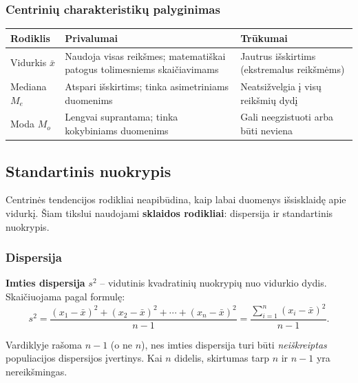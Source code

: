 \subsubsection*{Centrinių charakteristikų palyginimas}

\begin{center}
\begin{tabular}{|l|p{4.5cm}|p{4.5cm}|}
\hline
\textbf{Rodiklis} & \textbf{Privalumai} & \textbf{Trūkumai} \\
\hline
Vidurkis $\bar{x}$ &
  Naudoja visas reikšmes; matematiškai patogus tolimesniems skaičiavimams &
  Jautrus išskirtims (ekstremalus reikšmėms) \\
\hline
Mediana $M_e$ &
  Atspari išskirtims; tinka asimetriniams duomenims &
  Neatsižvelgia į visų reikšmių dydį \\
\hline
Moda $M_o$ &
  Lengvai suprantama; tinka kokybiniams duomenims &
  Gali neegzistuoti arba būti neviena \\
\hline
\end{tabular}
\end{center}

\subsection{Standartinis nuokrypis}

Centrinės tendencijos rodikliai neapibūdina, kaip labai duomenys išsisklaidę apie
vidurkį. Šiam tikslui naudojami \textbf{sklaidos rodikliai}: dispersija ir
standartinis nuokrypis.

\subsubsection*{Dispersija}

\begin{definition}
\textbf{Imties dispersija} $s^2$ – vidutinis kvadratinių nuokrypių nuo vidurkio
dydis. Skaičiuojama pagal formulę:
\[
  s^2 = \frac{(x_1 - \bar{x})^2 + (x_2 - \bar{x})^2 + \cdots + (x_n - \bar{x})^2}{n-1}
      = \frac{\displaystyle\sum_{i=1}^{n}(x_i - \bar{x})^2}{n-1}.
\]
\end{definition}

\begin{remark}
Vardiklyje rašoma $n-1$ (o ne $n$), nes imties dispersija turi būti \emph{neiškreiptas}
populiacijos dispersijos įvertinys. Kai $n$ didelis, skirtumas tarp $n$ ir $n-1$
yra nereikšmingas.
\end{remark}

